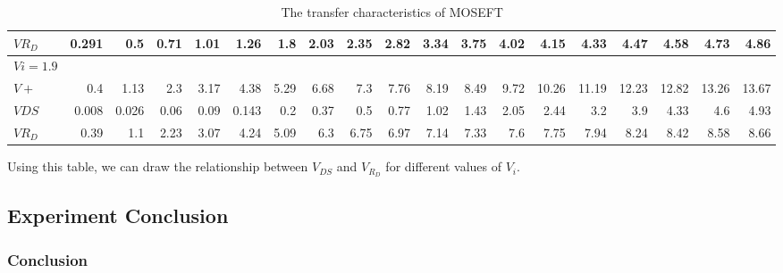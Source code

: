 \begin{table}[H]
\begin{tabular}{l|rrrrrrrrrrrrrrrrrr}
    $VR_D   $ & 0.291 & 0.5   & 0.71  & 1.01  & 1.26  & 1.8   & 2.03  & 2.35  & 2.82  & 3.34  & 3.75  & 4.02  & 4.15  & 4.33  & 4.47  & 4.58  & 4.73  & 4.86 \\
    \midrule \midrule
        $Vi=1.9 $  &       &       &       &       &       &       &       &       &       &       &       &       &       &       &       &       &       &  \\
        \midrule
    $V+     $ & 0.4   & 1.13  & 2.3   & 3.17  & 4.38  & 5.29  & 6.68  & 7.3   & 7.76  & 8.19  & 8.49  & 9.72  & 10.26 & 11.19 & 12.23 & 12.82 & 13.26 & 13.67 \\
    $VDS    $ & 0.008 & 0.026 & 0.06  & 0.09  & 0.143 & 0.2   & 0.37  & 0.5   & 0.77  & 1.02  & 1.43  & 2.05  & 2.44  & 3.2   & 3.9   & 4.33  & 4.6   & 4.93 \\
    $VR_D   $ & 0.39  & 1.1   & 2.23  & 3.07  & 4.24  & 5.09  & 6.3   & 6.75  & 6.97  & 7.14  & 7.33  & 7.6   & 7.75  & 7.94  & 8.24  & 8.42  & 8.58  & 8.66 \\
    \midrule
    \end{tabular}%
    
        \caption{The transfer characteristics of MOSEFT}
        \label{tab:}
    \end{table}

    Using this table, we can draw the relationship between $V_{DS}$ and $V_{R_D}$ for different values of $V_i$.
    
\subsection{Experiment Conclusion}
    \subsubsection{Conclusion}